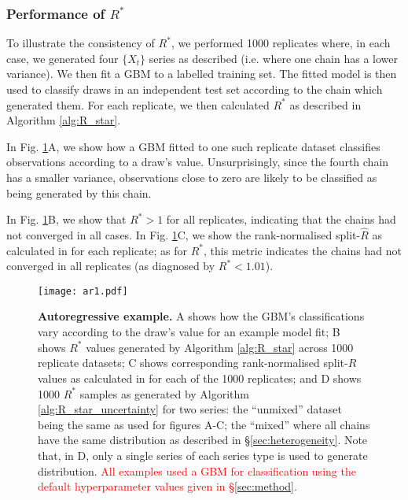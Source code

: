 \documentclass{article}
\begin{document}
\subsubsection{Performance of $R^*$}\label{sec:heterogeneity_performance}
To illustrate the consistency of $R^*$, we performed 1000 replicates where, in each case, we generated four $\{X_t\}$ series as described (i.e. where one chain has a lower variance). We then fit a GBM to a labelled training set. The fitted model is then used to classify draws in an independent test set according to the chain which generated them. For each replicate, we then calculated $R^*$ as described in Algorithm \ref{alg:R_star}.

In Fig. \ref{fig:ar1}A, we show how a GBM fitted to one such replicate dataset classifies observations according to a draw's value. Unsurprisingly, since the fourth chain has a smaller variance, observations close to zero are likely to be classified as being generated by this chain.

In Fig. \ref{fig:ar1}B, we show that $R^*>1$ for all replicates, indicating that the chains had not converged in all cases. In Fig. \ref{fig:ar1}C, we show the rank-normalised split-$\widehat{R}$ as calculated in \cite{vehtari2019rank} for each replicate;  as for $R^*$, this metric indicates the chains had not converged in all replicates (as diagnosed by $R^*<1.01$).

\begin{figure}[!htb]
	\centerline{\texttt{[image: ar1.pdf]}}
	\caption{\textbf{Autoregressive example.} A shows how the GBM's classifications vary according to the draw's value for an example model fit; B shows $R^*$ values generated by Algorithm \ref{alg:R_star} across 1000 replicate datasets; C shows corresponding rank-normalised split-$\widehat{R}$ values as calculated in \cite{vehtari2019rank} for each of the 1000 replicates; and D shows 1000 $R^*$ samples as generated by Algorithm \ref{alg:R_star_uncertainty} for two series: the ``unmixed'' dataset being the same as used for figures A-C; the ``mixed'' where all chains have the same distribution as described in \S\ref{sec:heterogeneity}. Note that, in D, only a single series of each series type is used to generate distribution. \textcolor{red}{All examples used a GBM for classification using the default hyperparameter values given in \S\ref{sec:method}.}}
	\label{fig:ar1}
\end{figure}
\end{document}
